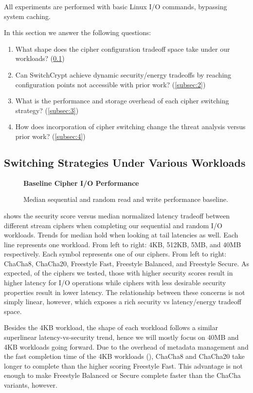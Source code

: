 All experiments are performed with basic Linux I/O commands, bypassing system
caching.

In this section we answer the following questions:

\begin{enumerate}
 \item What shape does the cipher configuration tradeoff space take under
 our workloads? (\cref{subsec:1})
 \item Can SwitchCrypt achieve dynamic security/energy tradeoffs by reaching
 configuration points not accessible with prior work? (\cref{subsec:2})
 \item What is the performance and storage overhead of each cipher switching
 strategy? (\cref{subsec:3})
 \item How does incorporation of cipher switching change the threat analysis
 versus prior work? (\cref{subsec:4})
\end{enumerate}

\subsection{Switching Strategies Under Various Workloads} \label{subsec:1}

\begin{figure}[ht]
  \textbf{Baseline Cipher I/O Performance}\par\medskip
  {} \caption{Median sequential and random
  read and write performance baseline.}
 \label{fig:tradeoff-no-ratios}
\end{figure}

 shows the security score versus median normalized
latency tradeoff between different stream ciphers when completing our sequential
and random I/O workloads. Trends for median hold when looking at tail latencies
as well. Each line represents one workload. From left to right: 4KB, 512KB, 5MB,
and 40MB respectively. Each symbol represents one of our ciphers. From left to
right: ChaCha8, ChaCha20, Freestyle Fast, Freestyle Balanced, and Freestyle
Secure. As expected, of the ciphers we tested, those with higher security scores
result in higher latency for I/O operations while ciphers with less desirable
security properties result in lower latency. The relationship between these
concerns is not simply linear, however, which exposes a rich security vs
latency/energy tradeoff space.

Besides the 4KB workload, the shape of each workload follows a similar
superlinear latency-vs-security trend, hence we will mostly focus on 40MB and
4KB workloads going forward. Due to the overhead of metadata management and the
fast completion time of the 4KB workloads (), ChaCha8 and ChaCha20 take longer to complete than the higher scoring
Freestyle Fast. This advantage is not enough to make Freestyle Balanced or
Secure complete faster than the ChaCha variants, however.

